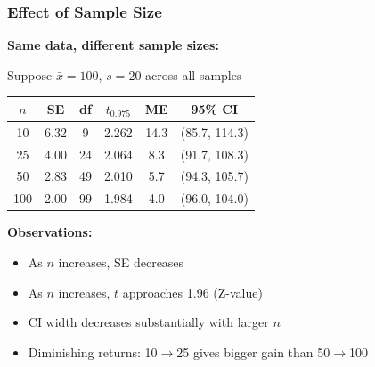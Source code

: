 \documentclass{beamer}
\begin{document}
\begin{frame}
\frametitle{Effect of Sample Size}
\textbf{Same data, different sample sizes:}

\vspace{0.3cm}
Suppose $\bar{x} = 100$, $s = 20$ across all samples

\vspace{0.3cm}
\begin{center}
\begin{tabular}{cccccc}
\toprule
$n$ & SE & df & $t_{0.975}$ & ME & 95\% CI \\
\midrule
10 & 6.32 & 9 & 2.262 & 14.3 & (85.7, 114.3) \\
25 & 4.00 & 24 & 2.064 & 8.3 & (91.7, 108.3) \\
50 & 2.83 & 49 & 2.010 & 5.7 & (94.3, 105.7) \\
100 & 2.00 & 99 & 1.984 & 4.0 & (96.0, 104.0) \\
\bottomrule
\end{tabular}
\end{center}

\vspace{0.3cm}
\textbf{Observations:}
\begin{itemize}
\item As $n$ increases, SE decreases
\item As $n$ increases, $t$ approaches 1.96 (Z-value)
\item CI width decreases substantially with larger $n$
\item Diminishing returns: 10$\to$25 gives bigger gain than 50$\to$100
\end{itemize}
\end{frame}
\end{document}
